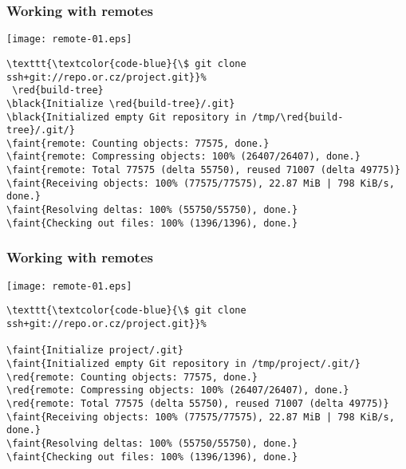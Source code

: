 \documentclass[english]{beamer}
\newcommand{\CMD}[1]{%
\texttt{\textcolor{code-blue}{#1}}%
}
\newcommand{\black}[1]{%
\textcolor{code-black}{#1}%
}
\newcommand{\faint}[1]{%
\textcolor{code-gray}{#1}%
}
\newcommand{\red}[1]{%
\textcolor{code-red}{#1}%
}
\begin{document}
\begin{frame}[fragile]
\frametitle{Working with remotes}

\texttt{[image: remote-01.eps]}

{\tiny
\begin{Verbatim}[commandchars=\\\{\}]
\CMD{\$ git clone ssh+git://repo.or.cz/project.git} \red{build-tree}
\black{Initialize \red{build-tree}/.git}
\black{Initialized empty Git repository in /tmp/\red{build-tree}/.git/}
\faint{remote: Counting objects: 77575, done.}
\faint{remote: Compressing objects: 100% (26407/26407), done.}
\faint{remote: Total 77575 (delta 55750), reused 71007 (delta 49775)}
\faint{Receiving objects: 100% (77575/77575), 22.87 MiB | 798 KiB/s, done.}
\faint{Resolving deltas: 100% (55750/55750), done.}
\faint{Checking out files: 100% (1396/1396), done.}
\end{Verbatim}
}
\vspace{\textheight}
\end{frame}

\begin{frame}[fragile]
\frametitle{Working with remotes}

\texttt{[image: remote-01.eps]}

{\tiny
\begin{Verbatim}[commandchars=\\\{\}]
\CMD{\$ git clone ssh+git://repo.or.cz/project.git}
\faint{Initialize project/.git}
\faint{Initialized empty Git repository in /tmp/project/.git/}
\red{remote: Counting objects: 77575, done.}
\red{remote: Compressing objects: 100% (26407/26407), done.}
\red{remote: Total 77575 (delta 55750), reused 71007 (delta 49775)}
\faint{Receiving objects: 100% (77575/77575), 22.87 MiB | 798 KiB/s, done.}
\faint{Resolving deltas: 100% (55750/55750), done.}
\faint{Checking out files: 100% (1396/1396), done.}
\end{Verbatim}
}
\vspace{\textheight}
\end{frame}
\end{document}
